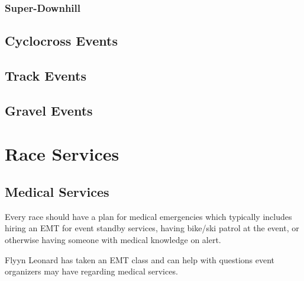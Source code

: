 \documentclass[
  letterpaper, %
  fontsize=10pt, %
  twoside=true,
  chapterentrydots=true, %
  numbers=noenddot,
  fontmethod=tex,
]{kaobook}
\begin{document}
\subsection{Super-Downhill}

\section{Cyclocross Events}

\section{Track Events}

\section{Gravel Events}

\setchapterpreamble[u]{\margintoc}
\chapter{Race Services}

\section{Medical Services}

Every race should have a plan for medical emergencies
which typically includes hiring an EMT %
for event standby services, %
having bike/ski patrol at the event,
or otherwise having someone with medical knowledge on alert.

\begin{kaobox}[title=Local EMT Knowledge]
Flyyn Leonard %
has taken an EMT class %
and can help with questions event organizers may have
regarding medical services.
\end{kaobox}
\end{document}
